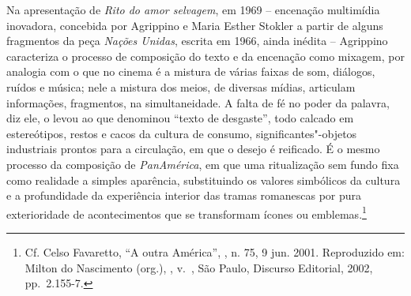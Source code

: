 Na apresentação de \emph{Rito do amor selvagem}, em 1969 -- encenação
multimídia inovadora, concebida por Agrippino e Maria Esther Stokler a
partir de alguns fragmentos da peça \emph{Nações Unidas}, escrita em
1966, ainda inédita -- Agrippino caracteriza o processo de composição do
texto e da encenação como mixagem, por analogia com o que no cinema é a
mistura de várias faixas de som, diálogos, ruídos e música; nele a
mistura dos meios, de diversas mídias, articulam informações,
fragmentos, na simultaneidade. A falta de fé no poder da palavra, diz
ele, o levou ao que denominou ``texto de desgaste'', todo calcado em
estereótipos, restos e cacos da cultura de consumo,
significantes"-objetos industriais prontos para a circulação, em que o
desejo é reificado. É o mesmo processo da composição de
\emph{PanAmérica}, em que uma ritualização sem fundo fixa como realidade
a simples aparência, substituindo os valores simbólicos da cultura e a
profundidade da experiência interior das tramas romanescas por pura
exterioridade de acontecimentos que se transformam ícones ou
emblemas.\footnote{Cf. Celso Favaretto, ``A outra América'', {}, n.
75, 9 jun. 2001. Reproduzido em: Milton do Nascimento (org.),
  {}, v.~, São Paulo, Discurso Editorial, 2002,
  pp.~2.155-7.}

